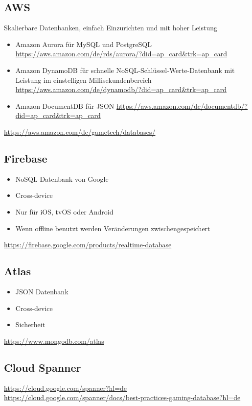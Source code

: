 \subsection{AWS}
Skalierbare Datenbanken, einfach Einzurichten und mit hoher Leistung
\begin{itemize}
    \item Amazon Aurora für MySQL und PostgreSQL \url{https://aws.amazon.com/de/rds/aurora/?did=ap_card&trk=ap_card}
    \item Amazon DynamoDB für schnelle NoSQL-Schlüssel-Werte-Datenbank mit Leistung im einstelligen Millisekundenbereich \url{https://aws.amazon.com/de/dynamodb/?did=ap_card&trk=ap_card}
    \item Amazon DocumentDB für JSON \url{https://aws.amazon.com/de/documentdb/?did=ap_card&trk=ap_card}
\end{itemize}

\url{https://aws.amazon.com/de/gametech/databases/}

\subsection{Firebase}

\begin{itemize}
    \item NoSQL Datenbank von Google
    \item Cross-device
    \item Nur für iOS, tvOS oder Android
    \item Wenn offline benutzt werden Veränderungen zwischengespeichert
\end{itemize}

\url{https://firebase.google.com/products/realtime-database}

\subsection{Atlas}

\begin{itemize}
    \item JSON Datenbank
    \item Cross-device
    \item Sicherheit
\end{itemize}

\url{https://www.mongodb.com/atlas}


\subsection{Cloud Spanner}

\url{https://cloud.google.com/spanner?hl=de}\\
\url{https://cloud.google.com/spanner/docs/best-practices-gaming-database?hl=de}